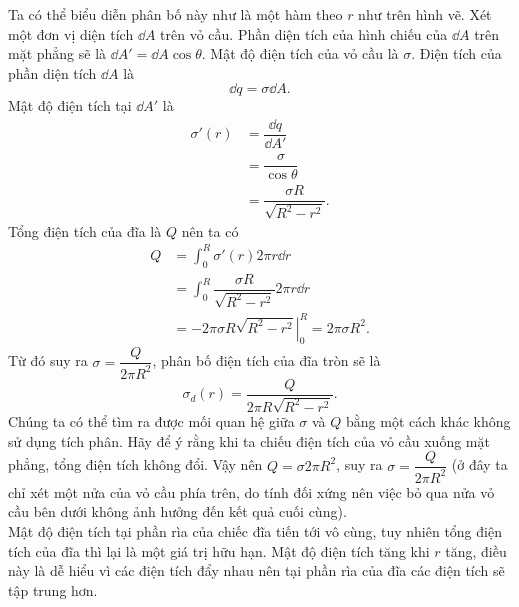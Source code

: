 \begin{loigiai}
\begin{center}
        \end{center}
        Ta có thể biểu diễn phân bố này như là một hàm theo $r$ như trên hình vẽ. Xét một đơn vị diện tích $\dd A$ trên vỏ cầu. Phần diện tích của hình chiếu của $\dd A$ trên mặt phẳng sẽ là $\dd A'=\dd A\cos\theta$. Mật độ điện tích của vỏ cầu là $\sigma$. Điện tích của phần diện tích $\dd A$ là 
        \begin{equation}
            \dd q=\sigma\dd A.
        \end{equation}
        Mật độ điện tích tại $\dd A'$ là
        \begin{equation}
        \begin{aligned}
            \sigma'(r)&=\dfrac{\dd q}{\dd A'}\\
            &=\dfrac{\sigma}{\cos\theta}\\
            &=\dfrac{\sigma R}{\sqrt{R^2-r^2}}.
        \end{aligned}
        \end{equation}
        Tổng điện tích của đĩa là $Q$ nên ta có
        \begin{equation}
            \begin{aligned}
               Q&=\int_0^R\sigma'(r)2\pi r\dd r\\
               &=\int_0^R\dfrac{\sigma R}{\sqrt{R^2-r^2}}2\pi r\dd r\\
               &=\left. -2\pi \sigma R\sqrt{R^2-r^2}\right|_0^R=2\pi\sigma R^2.
            \end{aligned}
        \end{equation}
        Từ đó suy ra $\sigma=\dfrac{Q}{2\pi R^2}$, phân bố điện tích của đĩa tròn sẽ là 
        \begin{equation}
            \sigma_d(r)=\dfrac{Q}{2\pi R\sqrt{R^2-r^2}}.
        \end{equation}
        Chúng ta có thể tìm ra được mối quan hệ giữa $\sigma$ và $Q$ bằng một cách khác không sử dụng tích phân. Hãy để ý rằng khi ta chiếu điện tích của vỏ cầu xuống mặt phẳng, tổng điện tích không đổi. Vậy nên $Q=\sigma 2\pi R^2$, suy ra $\sigma=\dfrac{Q}{2\pi R^2}$  (ở đây ta chỉ xét một nửa của vỏ cầu phía trên, do tính đối xứng nên việc bỏ qua nửa vỏ cầu bên dưới không ảnh hưởng đến kết quả cuối cùng).\\
        Mật độ điện tích tại phần rìa của chiếc đĩa tiến tới vô cùng, tuy nhiên tổng điện tích của đĩa thì lại là một giá trị hữu hạn. Mật độ điện tích tăng khi $r$ tăng, điều này là dễ hiểu vì các điện tích đẩy nhau nên tại phần rìa của đĩa các điện tích sẽ tập trung hơn. 
    \end{loigiai}
    
